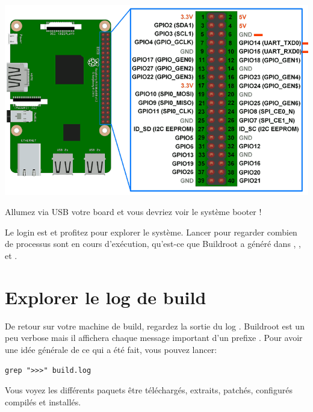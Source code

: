\begin{centering}
  \includegraphics[height=0.5\textheight]{pictures/04_labs/rpi3_gpio_layout_uarts.png} \\
\end{centering}

Allumez via USB votre board et vous devriez voir le système booter !

Le login est  et profitez pour explorer le système. Lancer
 pour regarder combien de processus sont en cours d'exécution,
qu'est-ce que Buildroot a généré dans , , 
et .

\section{Explorer le log de build}

De retour sur votre machine de build, regardez la sortie du log .
Buildroot est un peu verbose mais il affichera chaque message important d'un
prefixe \code{>>>}. Pour avoir une idée générale de ce qui a été fait, vous
pouvez lancer:

\begin{verbatim}
grep ">>>" build.log
\end{verbatim}

Vous voyez les différents paquets être téléchargés, extraits, patchés,
configurés compilés et installés.
